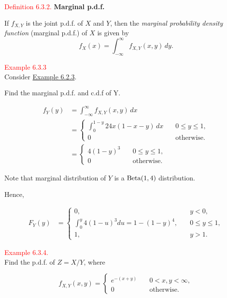 \documentclass[
]{book}
\begin{document}
\leavevmode{}%
\textcolor{red}{Definition 6.3.2.}
{\textbf{Marginal p.d.f.}}

If \(f_{X,Y}\) is the joint p.d.f. of \(X\) and \(Y\), then the \emph{marginal probability density function} (marginal p.d.f.) of \(X\) is given by
\[f_X(x) = \int_{-\infty}^\infty f_{X,Y}(x,y) \,dy.\]

\leavevmode{}%
\textcolor{red}{Example 6.3.3}\\
Consider \protect\hyperlink{jointdis:ex:joint_density_function_ex}{Example 6.2.3}.

Find the marginal p.d.f. and c.d.f of Y.

\hypertarget{jointdis:ex:marginal_distributions_sol}{}
\begin{align*}
f_Y(y) &= \int_{-\infty}^\infty f_{X,Y}(x,y) \,dx \\[9pt]
&= \begin{cases} \int_0^{1-y} 24x(1-x-y) \,dx \quad &0 \leq y \leq 1, \\[5pt]
0 \quad &\text{otherwise.} \end{cases} \\[9pt]
&= \begin{cases} 4(1-y)^3 \quad & 0 \leq y \leq 1, \\[5pt]
0 \quad  &\text{otherwise.} \end{cases}
\end{align*}

Note that marginal distribution of \(Y\) is a \({\rm Beta} (1,4)\) distribution.

Hence,

\begin{align*}
F_Y(y) &= \begin{cases} 0, \quad &y < 0,\\[5pt]
\int_0^y4 (1-u)^3 du = 1-(1-y)^4, \quad &0 \leq y \leq 1,\\[5pt]
1, \quad &y > 1.\end{cases}
\end{align*}

\hfill\break

\hypertarget{jointdis:exer:joint_Z_Exp}{}
\textcolor{red}{Example 6.3.4.}\\
Find the p.d.f. of \(Z=X/Y\), where

\[f_{X,Y}(x,y) =\begin{cases} e^{-(x+y)} \quad &0<x,y<\infty, \\[5pt]
0 \qquad \qquad &\text{otherwise.} \end{cases} \]
\end{document}
